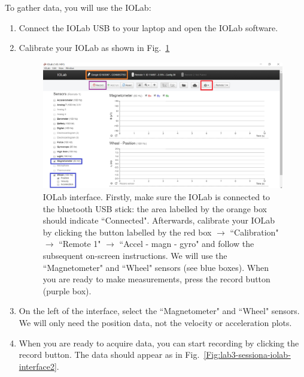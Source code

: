 \documentclass[12pt]{report}
\begin{document}
To gather data, you will use the IOLab:
\begin{enumerate}
\item Connect the IOLab USB to your laptop and open the IOLab software.
\item Calibrate your IOLab as shown in Fig.~\ref{Fig:lab3-sessiona-interface1} 

\begin{figure}[h]
\centering
\includegraphics[width=0.8 \textwidth]{lab3-sessiona-interface1}
\caption{IOLab interface. Firstly, make sure the IOLab is connected to the bluetooth USB stick: the area labelled by the orange box should indicate ``Connected". Afterwards, calibrate your IOLab by clicking the button labelled by the red box $\rightarrow$ ``Calibration" $\rightarrow$ ``Remote 1" $\rightarrow$ ``Accel - magn - gyro" and follow the subsequent on-screen instructions. We will use the ``Magnetometer" and ``Wheel" sensors (see blue boxes). When you are ready to make measurements, press the record button (purple box). }
\label{Fig:lab3-sessiona-interface1}
\end{figure}

\item On the left of the interface, select the ``Magnetometer" and ``Wheel" sensors. We will only need the position data, not the velocity or acceleration plots.

\item When you are ready to acquire data, you can start recording by clicking the record button. The data should appear as in Fig.~\ref{Fig:lab3-sessiona-iolab-interface2}.
\end{enumerate}
\end{document}
